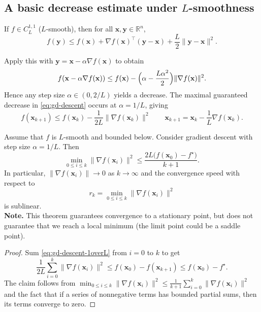 \subsection{A basic decrease estimate under \texorpdfstring{$L$}{L}-smoothness}

If $f \in C^{1,1}_L$ ($L$-smooth), then for all $\mathbf{x},\mathbf{y}\in\mathbb{R}^n$,
\begin{equation}
 \label{eq:l-smooth}
  f(\mathbf{y})\le f(\mathbf{x})+\nabla f(\mathbf{x})^\top (\mathbf{y}-\mathbf{x})
  +\frac{L}{2}\|\mathbf{y}-\mathbf{x}\|^2.
\end{equation}

\noindent Apply this with $\mathbf{y}=\mathbf{x}-\alpha \nabla f(\mathbf{x})$ to obtain
\begin{equation}
  \label{eq:gd-descent}
  f(\mathbf{x}-\alpha \nabla f(\mathbf{x}))
  \le f(\mathbf{x})-\Bigl(\alpha-\frac{L\alpha^2}{2}\Bigr)\|\nabla f(\mathbf{x})\|^2.
\end{equation}
Hence any step size $\alpha\in(0,2/L)$ yields a decrease. The maximal guaranteed
decrease in \eqref{eq:gd-descent} occurs at $\alpha=1/L$, giving
\begin{equation}
  \label{eq:gd-descent-1overL}
  f(\mathbf{x}_{k+1})\le f(\mathbf{x}_k)-\frac{1}{2L}\|\nabla f(\mathbf{x}_k)\|^2
  \qquad \mathbf{x}_{k+1}=\mathbf{x}_k-\frac{1}{L}\nabla f(\mathbf{x}_k).
\end{equation}



\begin{theorem}
\label{thm:sublinear-rate-lsmooth}
Assume that $f$ is $L$-smooth and bounded below. Consider gradient
descent with step size $\alpha=1/L$. Then
\[
  \min_{0\le i\le k}\|\nabla f(\mathbf{x}_i)\|^2
  \le \frac{2L\bigl(f(\mathbf{x}_0)-f^\star\bigr)}{k+1}.
\]
In particular, $\|\nabla f(\mathbf{x}_i)\|\to 0$ as $k\to\infty$ and the convergence speed with respect to
\[
  r_k = \min_{0\le i\le k}\|\nabla f(\mathbf{x}_i)\|^2
\]
is sublinear. \\
\textbf{Note.} This theorem guarantees convergence to a stationary point, but does not
guarantee that we reach a local minimum (the limit point could be a saddle point).
\end{theorem}
\begin{proof}
Sum \eqref{eq:gd-descent-1overL} from $i=0$ to $k$ to get
\[
  \frac{1}{2L}\sum_{i=0}^k \|\nabla f(\mathbf{x}_i)\|^2
  \le f(\mathbf{x}_0)-f(\mathbf{x}_{k+1})
  \le f(\mathbf{x}_0)-f^\star.
\]
The claim follows from $\min_{0\le i\le k}\|\nabla f(\mathbf{x}_i)\|^2\le
\frac{1}{k+1}\sum_{i=0}^k \|\nabla f(\mathbf{x}_i)\|^2$ and the fact that if a series of
nonnegative terms has bounded partial sums, then its terms converge to zero.
\end{proof}


